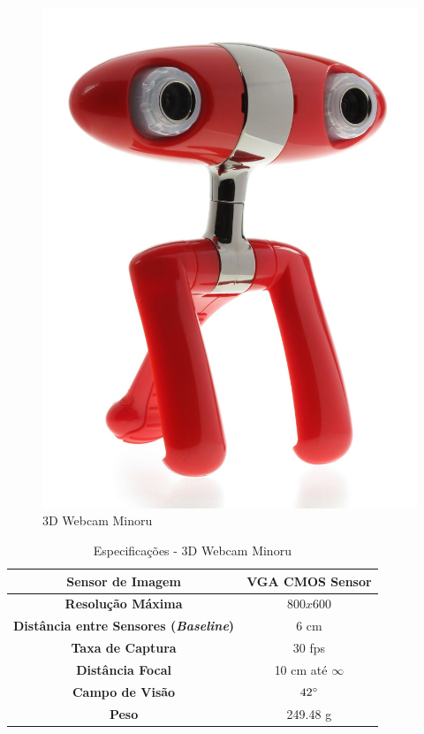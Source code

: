 \begin{figure}[H]
	\centering
	\includegraphics[scale=0.10]{./Resources/minoru.jpg}
	\caption{3D Webcam Minoru}
	\label{minoru}
\end{figure}

\begin{table}[]
\centering
\caption{Especificações - 3D Webcam Minoru}
\label{minoru_tab}
\begin{tabular}{|c|c|}
\hline
\textbf{Sensor de Imagem}      & VGA CMOS Sensor  		\\	\hline
\textbf{Resolução Máxima}      & $800x600$        		\\	\hline
\textbf{Distância entre Sensores (\textit{Baseline})} & 6 cm    \\	\hline
\textbf{Taxa de Captura}       & 30 fps             		\\	\hline
\textbf{Distância Focal}       & 10 cm até $\infty$		\\	\hline
\textbf{Campo de Visão}        & $42\degree$			\\	\hline
\textbf{Peso}		       & 249.48 g			\\	\hline
\end{tabular}
\end{table}


